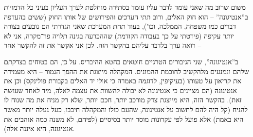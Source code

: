\documentclass[]{article}
\begin{document}
    משום שרוב מה שאני עומד לדבר עליו עומד בסתירה מוחלטת לערך העליון בעיני כל הדמויות ב''אנטיגונה'' – הוא חוק האלים, ורוב תתי הערכים והפירושים של אותו החוק (ששים בהעדפה דברים כמו משפחה, הממלכה, וכו'), בעוד תחת המערכת שאני הגדרתי הם נובעים בצורה יותר עקיפה (פירטתי על כך בעבודה הקודמת) שההכרעה בגינה תלויה פר־מקרה, אני לא רואה ערך בלדבר עליהם בהקשר הזה. לכן אני אקשר את זה להקשר אחר – 
    
    ב''אנטיגונה'', שני הגיבורים הטרגיים חוטאים בחטא ההיבריס. על כן, הם בטוחים בצדקתם שלהם ונמנעים מלהקשיב לחוכמת ההמונים. המקהלה מייצגת את ההפך הגמור – היא מעמידה את קריאון על טעותו (בעיקיפין, לדוגמה באמרה כי אולי יד האלים בקבורת פולינקס) וכן את אנטיגונה (הם מציינים כי אנטיגונה לא יכולה להשוות את עצמה לאלה, מיד לאחד שעושה זאת). בהקשר הזה, היא מייצגת צדק מורכב יותר, חכם יותר, שלא רק מניח את מה שנוח לו להניח (קל היה להם לחשוב על אנטיגונה, שהעם כולו והמקהלה חיבבו, כעל נעלה יותר מאשר היא באמת) אלא פועל לפי עקרונות מוסר יותר בסיסיים (לפיהם, לא משנה כמה אוהבים את אנטיגונה, היא איננה אלה). 
    
\end{document}
